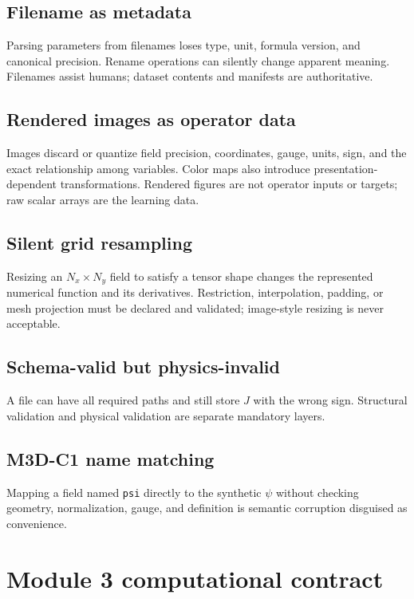\documentclass[11pt]{article}
\newcommand{\code}[1]{\texttt{#1}}
\begin{document}
\subsection{Filename as metadata}

Parsing parameters from filenames loses type, unit, formula version, and canonical precision. Rename operations can silently change apparent meaning. Filenames assist humans; dataset contents and manifests are authoritative.

\subsection{Rendered images as operator data}

Images discard or quantize field precision, coordinates, gauge, units, sign, and the exact relationship among variables. Color maps also introduce presentation-dependent transformations. Rendered figures are not operator inputs or targets; raw scalar arrays are the learning data.

\subsection{Silent grid resampling}

Resizing an $N_x\times N_y$ field to satisfy a tensor shape changes the represented numerical function and its derivatives. Restriction, interpolation, padding, or mesh projection must be declared and validated; image-style resizing is never acceptable.

\subsection{Schema-valid but physics-invalid}

A file can have all required paths and still store $J$ with the wrong sign. Structural validation and physical validation are separate mandatory layers.

\subsection{M3D-C1 name matching}

Mapping a field named \code{psi} directly to the synthetic $\psi$ without checking geometry, normalization, gauge, and definition is semantic corruption disguised as convenience.

\section{Module 3 computational contract}
\label{sec:contract}
\end{document}
